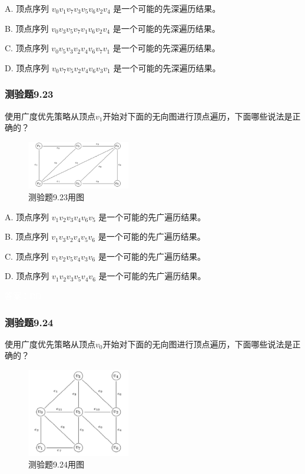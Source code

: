 \documentclass[UTF8, heading=true]{ctexart}
\begin{document}
A. 顶点序列 $v_0 v_1 v_7 v_3 v_5 v_6 v_2 v_4$ 是一个可能的先深遍历结果。

B. 顶点序列 $v_0 v_3 v_5 v_7 v_1 v_6 v_2 v_4$ 是一个可能的先深遍历结果。

C. 顶点序列 $v_0 v_5 v_3 v_2 v_4 v_6 v_7 v_1$ 是一个可能的先深遍历结果。

D.  顶点序列 $v_0 v_7 v_5 v_2 v_4 v_6 v_3 v_1$ 是一个可能的先深遍历结果。

\subsubsection{测验题9.23}

使用广度优先策略从顶点$v_1$开始对下面的无向图进行顶点遍历，下面哪些说法是正确的？

\begin{figure}[H]
  \centering
  \includegraphics[width=0.4\textwidth]{9.23.jpg} %
  \caption{测验题9.23用图}
\end{figure}


A. 顶点序列 $v_1 v_2 v_3 v_4 v_6 v_5$ 是一个可能的先广遍历结果。

B. 顶点序列 $v_1 v_3 v_2 v_4 v_5 v_6$ 是一个可能的先广遍历结果。

C. 顶点序列 $v_1 v_2 v_5 v_4 v_3 v_6$ 是一个可能的先广遍历结果。

D. 顶点序列 $v_1 v_2 v_3 v_5 v_4 v_6$ 是一个可能的先广遍历结果。

\textcolor{white}{答案：BD}

\subsubsection{测验题9.24}

使用广度优先策略从顶点$v_0$开始对下面的无向图进行顶点遍历，下面哪些说法是正确的？

\begin{figure}[H]
  \centering
  \includegraphics[width=0.4\textwidth]{9.24.jpg} %
  \caption{测验题9.24用图}
\end{figure}
\end{document}
